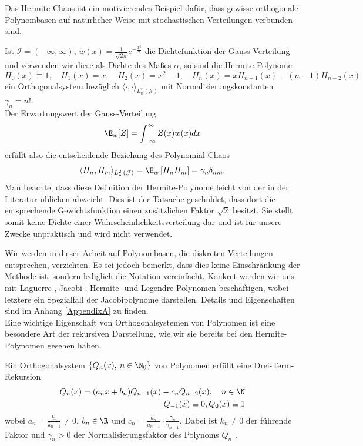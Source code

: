 Das Hermite-Chaos ist ein motivierendes Beispiel dafür, dass gewisse orthogonale Polynombasen auf natürlicher Weise mit stochastischen Verteilungen verbunden sind.
\begin{mathbsp}
\label{bsp:hermitechaos}
Ist $\mathcal{I}=(-\infty,\infty)$, $w(x)=\frac{1}{\sqrt{2\pi}}e^{-\frac{x^2}{2}}$ die Dichtefunktion der Gauss-Verteilung und verwenden wir diese als Dichte des Maßes $\alpha$, so sind die Hermite-Polynome
\[H_0(x)\equiv 1,\quad H_1(x)=x,\quad H_2(x)=x^2-1,\quad H_n(x)=xH_{n-1}(x)-(n-1)H_{n-2}(x)\]
ein Orthogonalsystem bezüglich $\langle\cdot,\cdot\rangle_{L_w^2(\mathcal{J})}$ mit Normalisierungskonstanten $\gamma_n=n!$.\\
Der Erwartungswert der Gauss-Verteilung
\[\E_w[Z]= \int_{-\infty}^\infty Z(x)w(x)dx\] erfüllt also die entscheidende Beziehung des Polynomial Chaos
\[\langle H_n,H_m\rangle_{L_w^2(\mathcal{J})} =\E_w \left[H_nH_m\right]=\gamma_n\delta_{nm}.\]
Man beachte, dass diese Definition der Hermite-Polynome leicht von der in der Literatur üblichen abweicht. Dies ist der Tatsache geschuldet, dass dort die entsprechende Gewichtsfunktion einen zusätzlichen Faktor $\sqrt{2}$ besitzt. Sie stellt somit keine Dichte einer Wahrscheinlichkeitsverteilung dar und ist für unsere Zwecke unpraktisch und wird nicht verwendet. 
\end{mathbsp}
Wir werden in dieser Arbeit auf Polynombasen, die diskreten Verteilungen entsprechen, verzichten. Es sei jedoch bemerkt, dass dies keine Einschränkung der Methode ist, sondern lediglich die Notation vereinfacht. Konkret werden wir uns mit Laguerre-, Jacobi-, Hermite- und Legendre-Polynomen beschäftigen, wobei letztere ein Spezialfall der Jacobipolynome darstellen. Details und Eigenschaften sind im Anhang \ref{AppendixA} zu finden.\\[0.3cm]
Eine wichtige Eigenschaft von Orthogonalsystemen von Polynomen ist eine besondere Art der rekursiven Darstellung, wie wir sie bereits bei den Hermite-Polynomen gesehen haben.
\begin{maththeorem}
\label{threetermexist}
Ein Orthogonalsystem $\left\lbrace Q_n(x),\: n\in\N_0\right\rbrace$ von Polynomen erfüllt eine Drei-Term-Rekursion
\begin{eqnarray}
Q_n(x)=(a_nx+b_n)Q_{n-1}(x)-c_nQ_{n-2}(x),\quad n\in\N\\
Q_{-1}(x)\equiv 0, Q_0(x)\equiv 1\nonumber
\end{eqnarray}
wobei $a_n=\frac{k_n}{k_{n-1}}\neq 0$, $b_n\in\R$ und $c_n=\frac{a_n}{a_{n-1}}\cdot \frac{\gamma_n}{\gamma_{n-1}}$.
Dabei ist $k_n\neq 0$ der führende Faktor und $\gamma_n>0$ der Normalisierungsfaktor des Polynoms $Q_n$ . 
\end{maththeorem}
